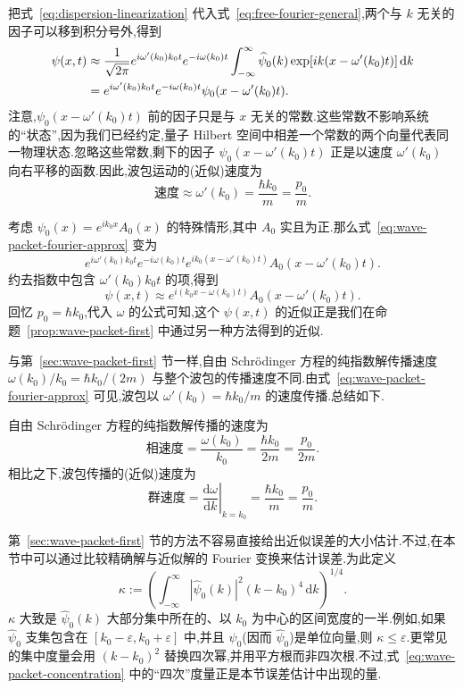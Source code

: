把式~\eqref{eq:dispersion-linearization} 代入式~\eqref{eq:free-fourier-general},两个与 \(k\) 无关的因子可以移到积分号外,得到
\begin{align}
\psi(x,t)
&\approx\frac{1}{\sqrt{2\pi}}e^{i\omega'(k_{0})k_{0}t}e^{-i\omega(k_{0})t}
\int_{-\infty}^{\infty}\widehat{\psi}_{0}(k)
\exp[i k(x-\omega'(k_{0})t)]\,\mathrm{d}k\notag\\
&=e^{i\omega'(k_{0})k_{0}t}e^{-i\omega(k_{0})t}
\psi_{0}(x-\omega'(k_{0})t).
\label{eq:wave-packet-fourier-approx}
\end{align}
注意,\(\psi_{0}(x-\omega'(k_{0})t)\) 前的因子只是与 \(x\) 无关的常数.这些常数不影响系统的“状态”,因为我们已经约定,量子 Hilbert 空间中相差一个常数的两个向量代表同一物理状态.忽略这些常数,剩下的因子 \(\psi_{0}(x-\omega'(k_{0})t)\) 正是以速度 \(\omega'(k_{0})\) 向右平移的函数.因此,波包运动的(近似)速度为
       \[
\text{速度}\approx\omega'(k_{0})
=\frac{\hbar k_{0}}{m}
=\frac{p_{0}}{m}.
\]

考虑 \(\psi_{0}(x)=e^{ik_{0}x}A_{0}(x)\) 的特殊情形,其中 \(A_{0}\) 实且为正.那么式~\eqref{eq:wave-packet-fourier-approx} 变为
\[
e^{i\omega'(k_{0})k_{0}t}e^{-i\omega(k_{0})t}
e^{ik_{0}(x-\omega'(k_{0})t)}
A_{0}(x-\omega'(k_{0})t).
\]
约去指数中包含 \(\omega'(k_{0})k_{0}t\) 的项,得到
\[
\psi(x,t)\approx e^{i(k_{0}x-\omega(k_{0})t)}
A_{0}(x-\omega'(k_{0})t).
\]
回忆 \(p_{0}=\hbar k_{0}\),代入 \(\omega\) 的公式可知,这个 \(\psi(x,t)\) 的近似正是我们在命题~\ref{prop:wave-packet-first} 中通过另一种方法得到的近似.

与第~\ref{sec:wave-packet-first} 节一样,自由 Schrödinger 方程的纯指数解传播速度 \(\omega(k_{0})/k_{0}=\hbar k_{0}/(2m)\) 与整个波包的传播速度不同.由式~\eqref{eq:wave-packet-fourier-approx} 可见,波包以 \(\omega'(k_{0})=\hbar k_{0}/m\) 的速度传播.总结如下.

\begin{proposition}\label{prop:group-phase-velocity}
自由 Schrödinger 方程的纯指数解传播的速度为
\[
\text{相速度}=\frac{\omega(k_{0})}{k_{0}}
=\frac{\hbar k_{0}}{2m}
=\frac{p_{0}}{2m}.
\]
相比之下,波包传播的(近似)速度为
\[
\text{群速度}
=\left.\frac{\mathrm{d}\omega}{\mathrm{d}k}\right|_{k=k_{0}}
=\frac{\hbar k_{0}}{m}
=\frac{p_{0}}{m}.
\]
\end{proposition}

第~\ref{sec:wave-packet-first} 节的方法不容易直接给出近似误差的大小估计.不过,在本节中可以通过比较精确解与近似解的 Fourier 变换来估计误差.为此定义
\begin{equation}
\kappa:=\left(\int_{-\infty}^{\infty}
|\widehat{\psi}_{0}(k)|^{2}(k-k_{0})^{4}\,\mathrm{d}k\right)^{1/4}.
\label{eq:wave-packet-concentration}
\end{equation}
\(\kappa\) 大致是 \(\widehat{\psi}_{0}(k)\) 大部分集中所在的、以 \(k_{0}\) 为中心的区间宽度的一半.例如,如果 \(\widehat{\psi}_{0}\) 支集包含在 \([k_{0}-\varepsilon,k_{0}+\varepsilon]\) 中,并且 \(\psi_{0}\)(因而 \(\widehat{\psi}_{0}\))是单位向量,则 \(\kappa\le\varepsilon\).更常见的集中度量会用 \((k-k_{0})^{2}\) 替换四次幂,并用平方根而非四次根.不过,式~\eqref{eq:wave-packet-concentration} 中的“四次”度量正是本节误差估计中出现的量.

